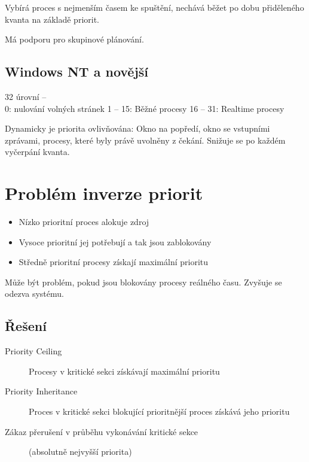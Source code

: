 \documentclass[a4wide]{report}
\begin{document}
Vybírá proces s nejmenším časem ke spuštění, nechává běžet po dobu přiděleného kvanta na základě priorit.

Má podporu pro skupinové plánování.

\subsection{Windows NT a novější}

32 úrovní --\\
0: nulování volných stránek
1 -- 15: Běžné procesy
16 -- 31: Realtime procesy

Dynamicky je priorita ovlivňována: Okno na popředí, okno se vstupními zprávami, procesy, které byly právě uvolněny z čekání. Snižuje se po každém vyčerpání kvanta.

\section{Problém inverze priorit}

\begin{itemize}
	\item Nízko prioritní proces alokuje zdroj
	\item Vysoce prioritní jej potřebují a tak jsou zablokovány
	\item Středně prioritní procesy získají maximální prioritu
\end{itemize}

Může být problém, pokud jsou blokovány procesy reálného času. Zvyšuje se odezva systému.

\subsection{Řešení}
\begin{description}
	\item[Priority Ceiling] Procesy v kritické sekci získávají maximální prioritu
	\item[Priority Inheritance] Proces v kritické sekci blokující prioritnější proces získává jeho prioritu
	\item[Zákaz přerušení v průběhu vykonávání kritické sekce] (absolutně nejvyšší priorita)
\end{description}
\end{document}
